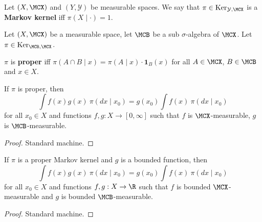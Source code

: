 \begin{definition}
    \label{def:markov-ker}
    \leanok{}

    Let $(X,\MCX)$ and $(Y,\mathcal{Y})$ be measurable spaces. We say that $\pi\in\text{Ker}_{\mathcal{Y},\MCX}$ is a \textbf{Markov kernel} iff $\pi(X\mid \cdot)=1$.
\end{definition}

Let $(X, \MCX)$ be a measurable space, let $\MCB$ be a sub $\sigma$-algebra of $\MCX$. Let $\pi \in \text{Ker}_{\MCB, \MCX}$.

\begin{definition}
    \label{def:proper-ker}
    \leanok{}

    $\pi$ is \textbf{proper} iff $\pi(A\cap B\mid x)=\pi(A\mid x)\cdot\mathbf{1}_B(x)$ for all $A\in\MCX$, $B\in\MCB$ and $x\in X$.
\end{definition}

\begin{lemma}
    \label{lem:proper-ker-lintegral}
    \leanok{}

    If $\pi$ is proper, then
    \[\int f(x) g(x)\ \pi(dx\mid x_0) = g(x_0)\int f(x)\ \pi(dx\mid x_0)\]
    for all $x_0 \in X$ and functions $f, g : X \to [0, \infty]$ such that $f$ is $\MCX$-measurable, $g$ is $\MCB$-measurable.
\end{lemma}
\begin{proof}
    \leanok{}

    Standard machine.
\end{proof}

\begin{lemma}
    \label{lem:proper-ker-integral}
    \leanok{}

    If $\pi$ is a proper Markov kernel and $g$ is a bounded function, then
    \[\int f(x) g(x)\ \pi(dx\mid x_0) = g(x_0)\int f(x)\ \pi(dx\mid x_0)\]
    for all $x_0 \in X$ and functions $f, g : X \to \R$ such that $f$ is bounded $\MCX$-measurable and $g$ is bounded $\MCB$-measurable.
\end{lemma}
\begin{proof}
    \leanok

    Standard machine.
\end{proof}

